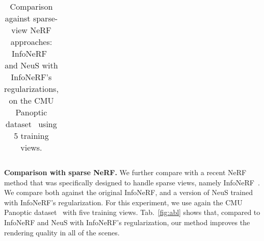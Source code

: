 \begin{table}[h!]
\begin{center}
{\begin{tabular}{c|l|ccc}
\bottomrule[1.2pt]
\end{tabular}}
 \caption{Comparison against sparse-view NeRF approaches: InfoNeRF~\cite{kim2022infonerf} and NeuS with InfoNeRF's regularizations, on the CMU Panoptic dataset~\cite{Simon_2017_CVPR,Joo_2017_TPAMI} using 5 training views. }
 \label{tab:sparse}
\end{center}
\end{table}

\noindent
\textbf{Comparison with sparse NeRF.} 
We further compare with a recent NeRF method that was specifically designed to handle sparse views, namely  InfoNeRF~\cite{kim2022infonerf}. We compare both against the original InfoNeRF, and a version of NeuS trained with InfoNeRF's regularization. For this experiment, we use again the CMU Panoptic dataset~\cite{Simon_2017_CVPR,Joo_2017_TPAMI} with five training views. 
Tab.~\ref{fig:abl} shows that, compared to InfoNeRF and NeuS with InfoNeRF's regularization, our method improves the rendering quality in all of the scenes.


